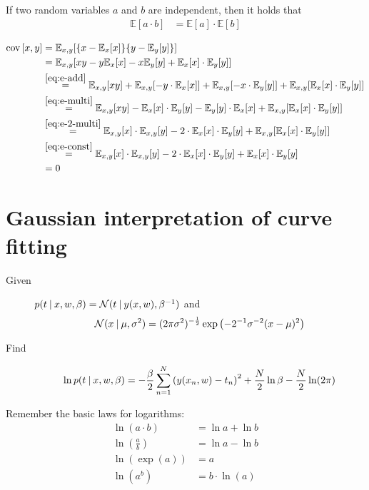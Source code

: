 \documentclass[a4paper]{article}
\newcommand\E{\mathbb{E}}
\newcommand\N{\mathcal{N}}
\DeclareMathOperator\cov{cov}
\newcommand\given{
  \nonscript\:
  \vert
  \nonscript\:
  \mathopen{}
  \allowbreak
}
\begin{document}
If two random variables $a$ and $b$ are independent, then it holds that
\begin{align}
  \E[a \cdot b] &= \E[a] \cdot \E[b]       \label{eq:e-2-multi}
\end{align}

\begin{align*}
  \cov{[x,y]}
    &= \E_{x,y}[\{x - \E_{x}[x]\}\{y - \E_{y}[y]\}] \\
    &= \E_{x,y}[xy - y\E_x[x] - x\E_y[y] + \E_x[x] \cdot \E_y[y]] \\
    &\overset{\eqref{eq:e-add}}{=} \E_{x,y}[xy] + \E_{x,y}[-y \cdot \E_x[x]] + \E_{x,y}[-x \cdot \E_y[y]] + \E_{x,y}[\E_x[x] \cdot \E_y[y]] \\
    &\overset{\eqref{eq:e-multi}}{=} \E_{x,y}[xy] - \E_x[x] \cdot \E_{y}[y] - \E_{y}[y] \cdot \E_{x}[x] + \E_{x,y}[\E_x[x] \cdot \E_y[y]] \\
    &\overset{\eqref{eq:e-2-multi}}{=} \E_{x,y}[x] \cdot \E_{x,y}[y] - 2 \cdot \E_x[x] \cdot \E_{y}[y] + \E_{x,y}[\E_x[x] \cdot \E_y[y]] \\
    &\overset{\eqref{eq:e-const}}{=} \E_{x,y}[x] \cdot \E_{x,y}[y] - 2 \cdot \E_x[x] \cdot \E_{y}[y] + \E_x[x] \cdot \E_y[y] \\
    &= 0
\end{align*}

\section{Gaussian interpretation of curve fitting}

\begin{description}
  \item[Given] $p(t \given x,w,\beta) = \N(t \given y(x,w), \beta^{-1})$ and
    \[ \N(x \given \mu, \sigma^2) = (2 \pi \sigma^2)^{-\frac12} \exp\left(-2^{-1} \sigma^{-2} (x - \mu)^2\right) \]
  \item[Find]
    \[ \ln{p(t \given x,w,\beta)} = -\frac{\beta}{2} \sum_{n=1}^N \left(y(x_n,w) - t_n\right)^2 + \frac{N}{2} \ln\beta - \frac{N}{2} \ln(2\pi) \]
\end{description}

Remember the basic laws for logarithms:
\begin{align}
  \ln(a \cdot b) &= \ln{a} + \ln{b}              \label{eq:ln-multi} \\
  \ln\left(\frac{a}{b}\right) &= \ln{a} - \ln{b} \label{eq:ln-div} \\
  \ln(\exp(a)) &= a                              \label{eq:ln-inv} \\
  \ln(a^b) &= b \cdot \ln(a)                     \label{eq:ln-power}
\end{align}
\end{document}
